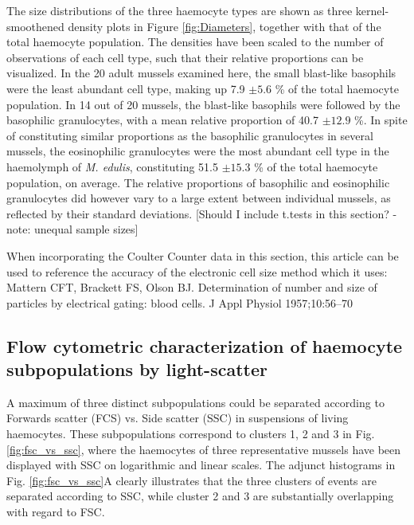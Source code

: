 The size distributions of the three haemocyte types are shown as three kernel-smoothened density plots in Figure \ref{fig:Diameters}, together with that of the total haemocyte population. The densities have been scaled to the number of observations of each cell type, such that their relative proportions can be visualized. In the 20 adult mussels examined here, the small blast-like basophils were the least abundant cell type, making up 7.9 $\pm{5.6}$ \% of the total haemocyte population. In 14 out of 20 mussels, the blast-like basophils were followed by the basophilic granulocytes, with a mean relative proportion of 40.7 $\pm{12.9}$ \%. In spite of constituting similar proportions as the basophilic granulocytes in several mussels, the eosinophilic granulocytes were the most abundant cell type in the haemolymph of \emph{M. edulis}, constituting 51.5 $\pm{15.3}$ \% of the total haemocyte population, on average. The relative proportions of basophilic and eosinophilic granulocytes did however vary to a large extent between individual mussels, as reflected by their standard deviations. [Should I include t.tests in this section? - note: unequal sample sizes]

When incorporating the Coulter Counter data in this section, this article can be used to reference the accuracy of the electronic cell size method which it uses: Mattern CFT, Brackett FS, Olson BJ. Determination of number and size of particles by electrical gating: blood cells. J Appl Physiol 1957;10:56–70


\subsection{Flow cytometric characterization of haemocyte subpopulations by light-scatter}
\label{subsection:Results_FlowChar}
A maximum of three distinct subpopulations could be separated according to Forwards scatter (FCS) vs. Side scatter (SSC) in suspensions of living haemocytes. These subpopulations correspond to clusters 1, 2 and 3 in Fig. \ref{fig:fsc_vs_ssc}, where the haemocytes of three representative mussels have been displayed with SSC on logarithmic and linear scales. The adjunct histograms in Fig. \ref{fig:fsc_vs_ssc}A clearly illustrates that the three clusters of events are separated according to SSC, while cluster 2 and 3 are substantially overlapping with regard to FSC.

